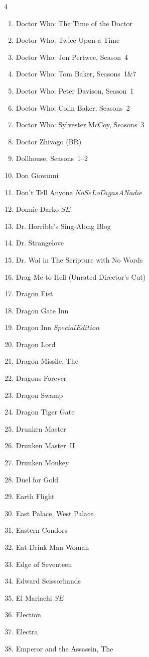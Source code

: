 \documentclass{article}
\newcommand\SE{\(SE\)}
\begin{document}
\begin{multicols}{4}
\begin{enumerate}
\item Doctor Who: The Time of the Doctor
\item Doctor Who: Twice Upon a Time
\item Doctor Who: Jon Pertwee, Season~4
\item Doctor Who: Tom Baker, Seasons~1\&7
\item Doctor Who: Peter Davison, Season~1
\item Doctor Who: Colin Baker, Seasons~2
\item Doctor Who: Sylvester McCoy, Seasons~3
\item Doctor Zhivago (BR)
\item Dollhouse, Seasons~1--2
\item Don Giovanni
\item Don't Tell Anyone \(No Se Lo Digas A Nadie\)
\item Donnie Darko \SE
\item Dr. Horrible's Sing-Along Blog
\item Dr. Strangelove
\item Dr. Wai in The Scripture with No Words
\item Drag Me to Hell (Unrated Director's Cut)
\item Dragon Fist
\item Dragon Gate Inn
\item Dragon Inn \(Special Edition\)
\item Dragon Lord
\item Dragon Missile, The
\item Dragons Forever
\item Dragon Swamp
\item Dragon Tiger Gate
\item Drunken Master
\item Drunken Master~II
\item Drunken Monkey
\item Duel for Gold
\item Earth Flight
\item East Palace, West Palace
\item Eastern Condors
\item Eat Drink Man Woman
\item Edge of Seventeen
\item Edward Scissorhands
\item El Mariachi \SE
\item Election
\item Electra
\item Emperor and the Assassin, The

\end{enumerate}
\end{multicols}
\end{document}
